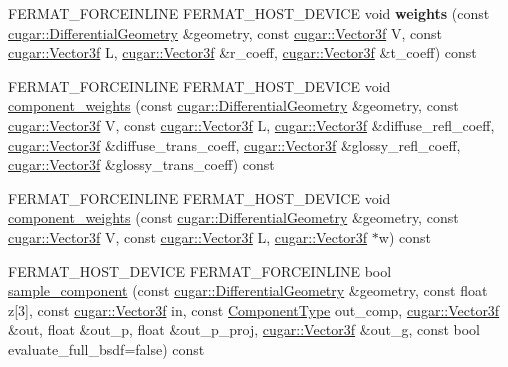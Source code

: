 \begin{DoxyCompactItemize}
\mbox{\label{struct_bsdf_af572e3b9da16737eeb585fefb56c62ef}} 
F\+E\+R\+M\+A\+T\+\_\+\+F\+O\+R\+C\+E\+I\+N\+L\+I\+NE F\+E\+R\+M\+A\+T\+\_\+\+H\+O\+S\+T\+\_\+\+D\+E\+V\+I\+CE void {\bfseries weights} (const \hyperlink{structcugar_1_1_differential_geometry}{cugar\+::\+Differential\+Geometry} \&geometry, const \hyperlink{structcugar_1_1_vector}{cugar\+::\+Vector3f} V, const \hyperlink{structcugar_1_1_vector}{cugar\+::\+Vector3f} L, \hyperlink{structcugar_1_1_vector}{cugar\+::\+Vector3f} \&r\+\_\+coeff, \hyperlink{structcugar_1_1_vector}{cugar\+::\+Vector3f} \&t\+\_\+coeff) const
\item 
F\+E\+R\+M\+A\+T\+\_\+\+F\+O\+R\+C\+E\+I\+N\+L\+I\+NE F\+E\+R\+M\+A\+T\+\_\+\+H\+O\+S\+T\+\_\+\+D\+E\+V\+I\+CE void \hyperlink{struct_bsdf_a474750a7281cd4945bc40ca5c9ea3ffd}{component\+\_\+weights} (const \hyperlink{structcugar_1_1_differential_geometry}{cugar\+::\+Differential\+Geometry} \&geometry, const \hyperlink{structcugar_1_1_vector}{cugar\+::\+Vector3f} V, const \hyperlink{structcugar_1_1_vector}{cugar\+::\+Vector3f} L, \hyperlink{structcugar_1_1_vector}{cugar\+::\+Vector3f} \&diffuse\+\_\+refl\+\_\+coeff, \hyperlink{structcugar_1_1_vector}{cugar\+::\+Vector3f} \&diffuse\+\_\+trans\+\_\+coeff, \hyperlink{structcugar_1_1_vector}{cugar\+::\+Vector3f} \&glossy\+\_\+refl\+\_\+coeff, \hyperlink{structcugar_1_1_vector}{cugar\+::\+Vector3f} \&glossy\+\_\+trans\+\_\+coeff) const
\item 
F\+E\+R\+M\+A\+T\+\_\+\+F\+O\+R\+C\+E\+I\+N\+L\+I\+NE F\+E\+R\+M\+A\+T\+\_\+\+H\+O\+S\+T\+\_\+\+D\+E\+V\+I\+CE void \hyperlink{struct_bsdf_a8390c41355fe415ebd71d3243266c6a9}{component\+\_\+weights} (const \hyperlink{structcugar_1_1_differential_geometry}{cugar\+::\+Differential\+Geometry} \&geometry, const \hyperlink{structcugar_1_1_vector}{cugar\+::\+Vector3f} V, const \hyperlink{structcugar_1_1_vector}{cugar\+::\+Vector3f} L, \hyperlink{structcugar_1_1_vector}{cugar\+::\+Vector3f} $\ast$w) const
\item 
F\+E\+R\+M\+A\+T\+\_\+\+H\+O\+S\+T\+\_\+\+D\+E\+V\+I\+CE F\+E\+R\+M\+A\+T\+\_\+\+F\+O\+R\+C\+E\+I\+N\+L\+I\+NE bool \hyperlink{struct_bsdf_a99fc011c47e622f99dbbc78dc7a930a1}{sample\+\_\+component} (const \hyperlink{structcugar_1_1_differential_geometry}{cugar\+::\+Differential\+Geometry} \&geometry, const float z\mbox{[}3\mbox{]}, const \hyperlink{structcugar_1_1_vector}{cugar\+::\+Vector3f} in, const \hyperlink{struct_bsdf_a5f7db6f81220ed9ee6da109d6eb5b585}{Component\+Type} out\+\_\+comp, \hyperlink{structcugar_1_1_vector}{cugar\+::\+Vector3f} \&out, float \&out\+\_\+p, float \&out\+\_\+p\+\_\+proj, \hyperlink{structcugar_1_1_vector}{cugar\+::\+Vector3f} \&out\+\_\+g, const bool evaluate\+\_\+full\+\_\+bsdf=false) const

\end{DoxyCompactItemize}

